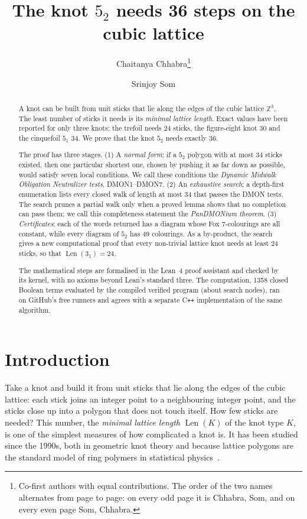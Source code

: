 \documentclass[11pt]{article}
\title{The knot $5_2$ needs 36 steps on the cubic lattice}
\author{Chaitanya Chhabra\thanks{Co-first authors with equal contributions. The order of the two names
alternates from page to page: on every odd page it is Chhabra, Som, and on every even page Som, Chhabra.}
\and Srinjoy Som\footnotemark[1]}
\date{}
\theoremstyle{plain}
\theoremstyle{definition}
\theoremstyle{remark}
\newcommand{\Len}{\operatorname{Len}}
\newcommand{\Z}{\mathbb{Z}}
\begin{document}
\maketitle

\begin{abstract}
A knot can be built from unit sticks that lie along the edges of the cubic lattice $\Z^3$. The
least number of sticks it needs is its \emph{minimal lattice length}. Exact values have been reported
for only three knots: the trefoil needs 24 sticks, the figure-eight knot 30 and the cinquefoil $5_1$
34. We prove that the knot $5_2$ needs exactly 36.

The proof has three stages. (1) A \emph{normal form}: if a $5_2$ polygon with at most 34 sticks
existed, then one particular shortest one, chosen by pushing it as far down as possible, would satisfy
seven local conditions. We call these conditions the \emph{Dynamic Midwalk Obligation Neutralizer
tests}, DMON1--DMON7. (2) An \emph{exhaustive search}: a depth-first enumeration lists every closed
walk of length at most 34 that passes the DMON tests. The search prunes a partial walk only when a
proved lemma shows that no completion can pass them; we call this completeness statement the
\emph{PanDMONium theorem}. (3) \emph{Certificates}: each of the \NWords{} words returned has a
diagram whose Fox $7$-colourings are all constant, while every diagram of $5_2$ has 49 colourings.
As a by-product, the search gives a new computational proof that every non-trivial lattice knot needs at least 24 sticks, so that $\Len(3_1)=24$.

The mathematical steps are formalised in the Lean~4 proof assistant and checked by its kernel,
with no axioms beyond Lean's standard three. The computation, \num{1358} closed Boolean terms
evaluated by the compiled verified program (about \NNodes{} search nodes), ran on GitHub's free
runners and agrees with a separate C\texttt{++} implementation of the same algorithm.
\end{abstract}

\tableofcontents

\section{Introduction}\label{sec:intro}

Take a knot and build it from unit sticks that lie along the edges of the cubic lattice: each stick
joins an integer point to a neighbouring integer point, and the sticks close up into a polygon that
does not touch itself. How few sticks are needed? This number, the \emph{minimal lattice length}
$\Len(K)$ of the knot type $K$, is one of the simplest measures of how complicated a knot is. It has
been studied since the 1990s, both in geometric knot theory and because lattice polygons are the
standard model of ring polymers in statistical physics~\cite{Diao93,Sch09,JvRR11}.
\end{document}
